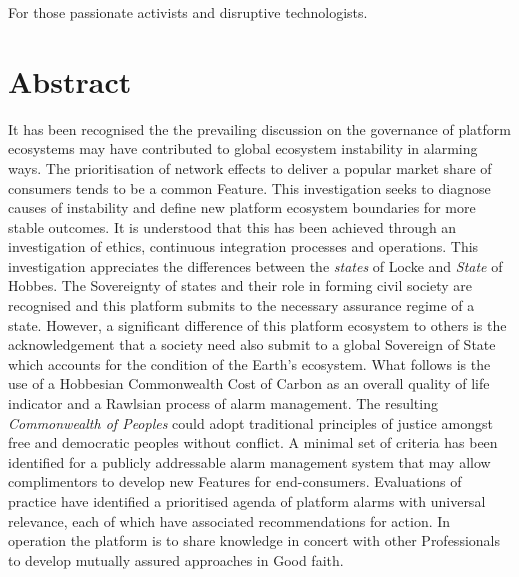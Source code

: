 \documentclass[11pt, oneside]{book}   	%
\begin{document}
\newpage
\thispagestyle{empty}
\mbox{}
\newpage

\vspace*{50mm}
\begin{center}
For those passionate activists and disruptive technologists.
\end{center}

\newpage
\thispagestyle{empty}
\mbox{}
\newpage

\chapter*{Abstract}
It has been recognised the the prevailing discussion on the governance of platform ecosystems may have contributed to global ecosystem instability in alarming ways.
The prioritisation of network effects to deliver a popular market share of consumers tends to be a common Feature.
This investigation seeks to diagnose causes of instability and define new platform ecosystem boundaries for more stable outcomes.
It is understood that this has been achieved through an investigation of ethics, continuous integration processes and operations.
This investigation appreciates the differences between the \emph{states} of Locke and \emph{State} of Hobbes.
The Sovereignty of states and their role in forming civil society are recognised and this platform submits to the necessary assurance regime of a state.
However, a significant difference of this platform ecosystem to others is the acknowledgement that a society need also submit to a global Sovereign of State which accounts for the condition of the Earth's ecosystem.
What follows is the use of a Hobbesian Commonwealth Cost of Carbon as an overall quality of life indicator and a Rawlsian process of alarm management.
The resulting \emph{Commonwealth of Peoples} could adopt traditional principles of justice amongst free and democratic peoples without conflict.
A minimal set of criteria has been identified for a publicly addressable alarm management system that may allow complimentors to develop new Features for end-consumers.
Evaluations of practice have identified a prioritised agenda of platform alarms with universal relevance, each of which have associated recommendations for action.
In operation the platform is to share knowledge in concert with other Professionals to develop mutually assured approaches in Good faith.

\newpage
\thispagestyle{empty}
\mbox{}
\newpage
\end{document}
